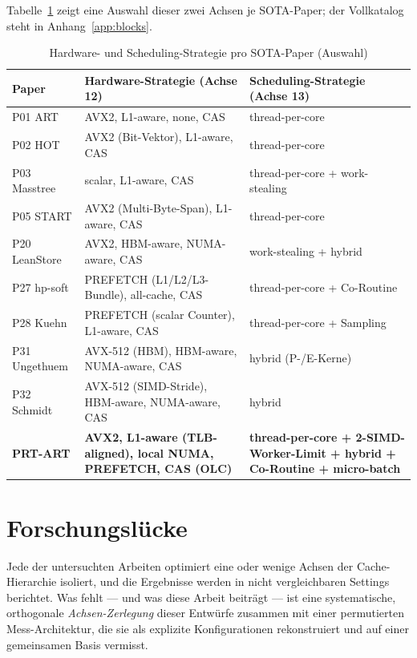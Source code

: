Tabelle~\ref{tab:hw-sched} zeigt eine Auswahl dieser zwei Achsen je SOTA-Paper; der
Vollkatalog steht in Anhang~\ref{app:blocks}.

\begin{table}[h!]
\centering\small
\caption{Hardware- und Scheduling-Strategie pro SOTA-Paper (Auswahl)}\label{tab:hw-sched}
\begin{tabular}{lll}
\toprule
\textbf{Paper} & \textbf{Hardware-Strategie (Achse 12)} & \textbf{Scheduling-Strategie (Achse 13)} \\
\midrule
P01 ART & AVX2, L1-aware, none, CAS & thread-per-core \\
P02 HOT & AVX2 (Bit-Vektor), L1-aware, CAS & thread-per-core \\
P03 Masstree & scalar, L1-aware, CAS & thread-per-core + work-stealing \\
P05 START & AVX2 (Multi-Byte-Span), L1-aware, CAS & thread-per-core \\
P20 LeanStore & AVX2, HBM-aware, NUMA-aware, CAS & work-stealing + hybrid \\
P27 hp-soft & PREFETCH (L1/L2/L3-Bundle), all-cache, CAS & thread-per-core + Co-Routine \\
P28 Kuehn & PREFETCH (scalar Counter), L1-aware, CAS & thread-per-core + Sampling \\
P31 Ungethuem & AVX-512 (HBM), HBM-aware, NUMA-aware, CAS & hybrid (P-/E-Kerne) \\
P32 Schmidt & AVX-512 (SIMD-Stride), HBM-aware, NUMA-aware, CAS & hybrid \\
\midrule
\textbf{PRT-ART} & \textbf{AVX2, L1-aware (TLB-aligned), local NUMA, PREFETCH, CAS (OLC)} & \textbf{thread-per-core + 2-SIMD-Worker-Limit + hybrid + Co-Routine + micro-batch} \\
\bottomrule
\end{tabular}
\end{table}

\section{Forschungslücke}\label{sec:gap}

Jede der untersuchten Arbeiten optimiert eine oder wenige Achsen der Cache-Hierarchie
isoliert, und die Ergebnisse werden in nicht vergleichbaren Settings berichtet. Was fehlt ---
und was diese Arbeit beiträgt --- ist eine systematische, orthogonale \emph{Achsen-Zerlegung}
dieser Entwürfe zusammen mit einer permutierten Mess-Architektur, die sie als explizite
Konfigurationen rekonstruiert und auf einer gemeinsamen Basis vermisst.
